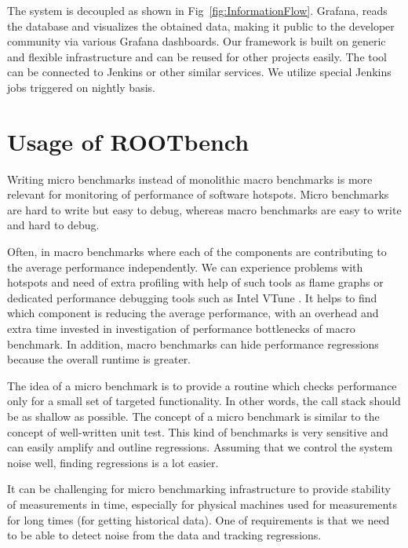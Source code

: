 \documentclass{webofc}
\begin{document}
The system is decoupled as shown in Fig~\ref{fig:InformationFlow}. Grafana, reads the database and visualizes the obtained data, making it public to the developer community via various Grafana dashboards. Our framework is built on generic and flexible infrastructure and can be reused for other projects easily. The tool can be connected to Jenkins or other similar services. We utilize special Jenkins jobs triggered on nightly basis.



\section {Usage of ROOTbench}


Writing micro benchmarks instead of monolithic macro benchmarks is more relevant for monitoring of performance of software hotspots. Micro benchmarks are hard to write but easy to debug, whereas macro benchmarks are easy to write and hard to debug.

Often, in macro benchmarks where each of the components are contributing to the average performance independently. We can experience problems with hotspots and need of extra profiling with help of such tools as flame graphs or dedicated performance debugging tools such as Intel VTune \cite{vtune}. It helps to find which component is reducing the average performance, with an overhead and extra time invested in investigation of performance bottlenecks of macro benchmark. In addition, macro benchmarks can hide performance regressions because the overall runtime is greater.

The idea of a micro benchmark is to provide a routine which checks performance only for a small set of targeted functionality. In other words, the call stack should be as shallow as possible. The concept of a micro benchmark is similar to the concept of well-written unit test. This kind of benchmarks is very sensitive and can easily amplify and outline regressions. Assuming that we control the system noise well, finding regressions is a lot easier.

It can be challenging for micro benchmarking infrastructure to provide stability of measurements in time, especially for physical machines used for measurements for long times (for getting historical data).  One of requirements is that we need to be able to detect noise from the data and tracking regressions.
\end{document}
